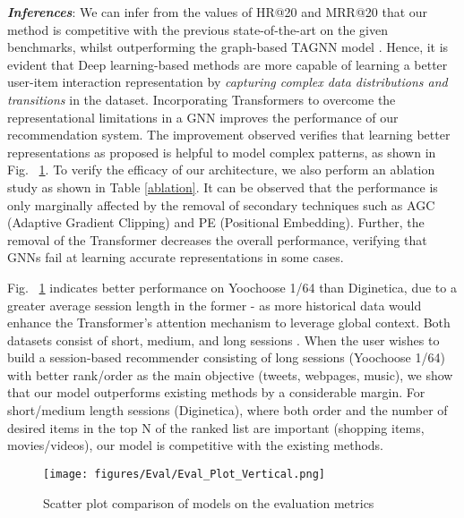 \documentclass[conference]{IEEEtran}
\begin{document}
      \textbf{\textit{Inferences}}: We can infer from the values of HR@20 and MRR@20 that our method is competitive with the previous state-of-the-art on the given benchmarks, whilst outperforming the graph-based TAGNN model \cite{yu2020tagnn}. Hence, it is evident that Deep learning-based methods are more capable of learning a better user-item interaction representation by \emph{capturing complex data distributions and transitions} in the dataset. Incorporating Transformers to overcome the representational limitations in a GNN improves the performance of our recommendation system. The improvement observed verifies that learning better representations as proposed is helpful to model complex patterns, as shown in Fig. ~\ref{fig:eval_sbr}. To verify the efficacy of our architecture, we also perform an ablation study as shown in Table \ref{ablation}. It can be observed that the performance is only marginally affected by the removal of secondary techniques such as AGC (Adaptive Gradient Clipping) and PE (Positional Embedding). Further, the removal of the Transformer decreases the overall performance, verifying that GNNs fail at learning accurate representations in some cases.


Fig. ~\ref{fig:eval_sbr} indicates better performance on Yoochoose 1/64 than Diginetica, due to a greater average session length in the former - as more historical data would enhance the Transformer’s attention mechanism to leverage global context. Both datasets consist of short, medium, and long sessions \cite{Wang2019ASO}. When the user wishes to build a session-based recommender consisting of long sessions (Yoochoose 1/64) with better rank/order as the main objective (tweets, webpages, music), we show that our model outperforms existing methods by a considerable margin. For short/medium length sessions (Diginetica), where both order and the number of desired items in the top N of the ranked list are important (shopping items, movies/videos), our model is competitive with the existing methods. 

\begin{figure}[htb]
    \centering
    \texttt{[image: figures/Eval/Eval\_Plot\_Vertical.png]}
    \caption{Scatter plot comparison of models on the evaluation metrics}
    \label{fig:eval_sbr}
\end{figure}
\end{document}
